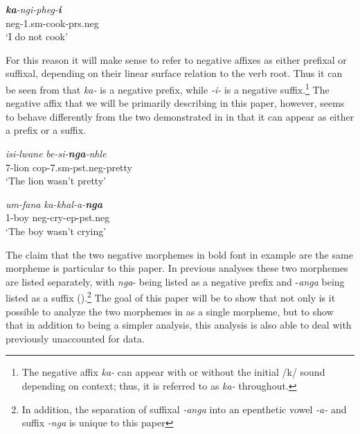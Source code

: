 \documentclass[output=paper]{langsci/langscibook}
\newcommand{\ii}[0]{\textit{-i- }}
\begin{document}
\begin{exe}
\ex\label{ex:burkholder:1}
\gll  \textit{\textbf {ka}-ngi-pheg-\textbf{i}}\\
          {\sc neg}-1.{\sc sm}-cook-{\sc prs.neg}\\
    \glt `I do not cook'
\end{exe}


For this reason it will make sense to refer to negative affixes as either prefixal or suffixal, depending on their linear surface relation to the verb root. Thus it can be seen from  that \textit{ka-} is a negative prefix, while \ii is a negative suffix.\footnote{The negative affix \textit{ka-} can appear with or without the initial /k/ sound depending on context; thus, it is referred to as \textit{ka-} throughout.} The negative affix that we will be primarily describing in this paper, however, seems to behave differently from the two demonstrated in  in that it can appear as either a prefix or a suffix.

\begin{exe}
\ex\label{ex:burkholder:2}
\begin{xlist}
\ex\label{ex:burkholder:2a} 
\gll \textit{isi-lwane}  \textit{be-si-\textbf{nga}-nhle}\\
       7-lion {\sc cop}-7.{\sc sm}-{\sc pst.neg}-pretty\\
    \glt `The lion wasn't pretty' 

\ex\label{ex:burkholder:2b}  
\gll \textit{um-fana} \textit{ka-khal-a-\textbf{nga}}\\
         1-boy {\sc neg}-cry-{\sc ep}-{\sc pst.neg}\\
    \glt `The boy wasn't crying'
\end{xlist}
\end{exe}

The claim that the two negative morphemes in bold font in example  are the same morpheme is particular to this paper. In previous analyses these two morphemes are listed separately, with \textit{nga}- being listed as a negative prefix and -\textit{anga} being listed as a suffix (\citealt{Sibanda2004,Khumalo1981,Khumalo1982}).\footnote{In addition, the separation of suffixal \textit{-anga} into an epenthetic vowel \textit{-a-} and suffix \textit{-nga} is unique to this paper} The goal of this paper will be to show that not only is it possible to analyze the two morphemes in  as a single morpheme, but to show that in addition to being a simpler analysis, this analysis is also able to deal with previously unaccounted for data.
\end{document}
